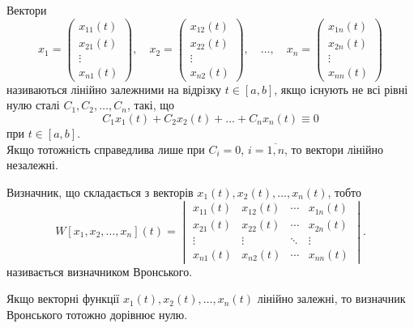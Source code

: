 \begin{definition}
	Вектори \[ x_1 = \begin{pmatrix} x_{11}(t) \\ x_{21}(t) \\ \vdots \\ x_{n1}(t) \end{pmatrix}, \quad x_2 = \begin{pmatrix} x_{12}(t) \\ x_{22}(t) \\ \vdots \\ x_{n2}(t) \end{pmatrix}, \quad \ldots, \quad x_n = \begin{pmatrix} x_{1n}(t) \\ x_{2n}(t) \\ \vdots \\ x_{nn}(t) \end{pmatrix} \] називаються лінійно залежними на відрізку $t \in [a, b]$, якщо існують не всі рівні нулю сталі $C_1, C_2, \ldots, C_n$, такі, що 
	\begin{equation*}
		C_1 x_1(t) + C_2 x_2(t) + \ldots + C_n x_n(t) \equiv 0
	\end{equation*}
	при $t \in [a, b]$. \\

	Якщо тотожність справедлива лише при $C_i = 0$, $i = \overline{1, n}$, то вектори лінійно незалежні.
\end{definition}

\begin{definition}
	Визначник, що складається з векторів $x_1(t), x_2(t), \ldots, x_n(t)$, тобто
	\begin{equation*}
		W[x_1, x_2, \ldots, x_n](t) = \begin{vmatrix} x_{11}(t) & x_{12}(t) & \cdots & x_{1n}(t) \\ x_{21}(t) & x_{22}(t) & \cdots & x_{2n}(t) \\ \vdots & \vdots & \ddots & \vdots \\ x_{n1}(t) & x_{n2}(t) & \cdots & x_{nn}(t) \end{vmatrix}.
	\end{equation*}
	називається визначником Вронського.
\end{definition}

\begin{theorem}
	Якщо векторні функції $x_1(t), x_2(t), \ldots, x_n(t)$ лінійно залежні, то визначник Вронського тотожно дорівнює нулю.
\end{theorem}

